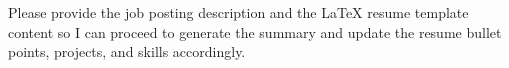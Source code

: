 Please provide the job posting description and the LaTeX resume template content so I can proceed to generate the summary and update the resume bullet points, projects, and skills accordingly.